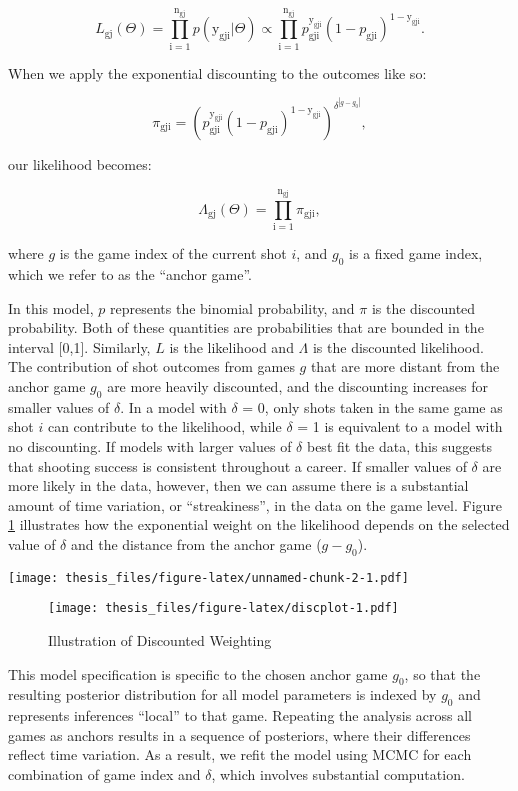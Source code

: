\documentclass[12pt,twoside]{dukestatscithesis}
\theoremstyle{definition}
\theoremstyle{definition}
\theoremstyle{definition}
\theoremstyle{remark}
\begin{document}
\[
L_\text{gj}(\Theta) =
\prod_{\text{i}=1}^{\text{n}_\text{gj}}{
  p(\text{y}_{\text{gji}} | \Theta) 
}
\propto 
\prod_{\text{i}=1}^{\text{n}_\text{gj}}{
  p_\text{gji}^{\text{y}_\text{gji}} 
  (1 - p_\text{gji})^{1-\text{y}_\text{gji}}
}.
\]

When we apply the exponential discounting to the outcomes like so:

\[
\pi_{\text{gji}} =
\left(
  p_\text{gji}^{\text{y}_\text{gji}} 
  (1 - p_\text{gji})^{1-\text{y}_\text{gji}}
\right)
^{\delta^{|g-g_0|}},
\]

our likelihood becomes:

\[
\Lambda_{\text{gj}}(\Theta) = 
\prod_{\text{i}=1}^{\text{n}_\text{gj}}
  \pi_{\text{gji}},
\]

where \({g}\) is the game index of the current shot \(\textit{i}\), and
\(g_0\) is a fixed game index, which we refer to as the ``anchor game''.

In this model, \(p\) represents the binomial probability, and \(\pi\) is
the discounted probability. Both of these quantities are probabilities
that are bounded in the interval {[}0,1{]}. Similarly, \(L\) is the
likelihood and \(\Lambda\) is the discounted likelihood. The
contribution of shot outcomes from games \(g\) that are more distant
from the anchor game \(g_0\) are more heavily discounted, and the
discounting increases for smaller values of \(\delta\). In a model with
\(\delta\) = 0, only shots taken in the same game as shot \(i\) can
contribute to the likelihood, while \(\delta\) = 1 is equivalent to a
model with no discounting. If models with larger values of \(\delta\)
best fit the data, this suggests that shooting success is consistent
throughout a career. If smaller values of \(\delta\) are more likely in
the data, however, then we can assume there is a substantial amount of
time variation, or ``streakiness'', in the data on the game level.
Figure \ref{fig:discplot} illustrates how the exponential weight on the
likelihood depends on the selected value of \(\delta\) and the distance
from the anchor game (\(g - g_0\)).

\texttt{[image: thesis\_files/figure-latex/unnamed-chunk-2-1.pdf]}

\pagebreak
\begin{figure}[htbp]
\centering
\texttt{[image: thesis\_files/figure-latex/discplot-1.pdf]}
\caption{\label{fig:discplot}Illustration of Discounted Weighting}
\end{figure}
This model specification is specific to the chosen anchor game \(g_0\),
so that the resulting posterior distribution for all model parameters is
indexed by \(g_0\) and represents inferences ``local'' to that game.
Repeating the analysis across all games as anchors results in a sequence
of posteriors, where their differences reflect time variation. As a
result, we refit the model using MCMC for each combination of game index
and \(\delta\), which involves substantial computation.
\end{document}
